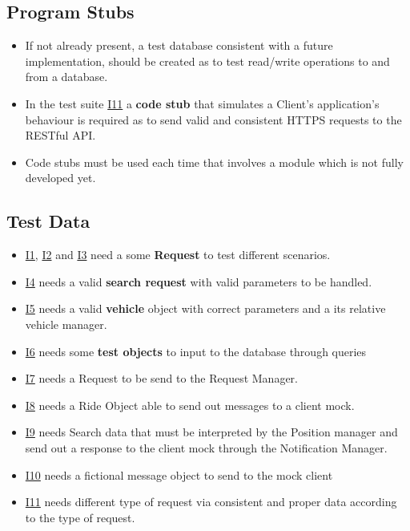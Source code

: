 \subsection{Program Stubs}
\begin{itemize}
\item If not already present, a test database consistent with a future implementation, should be created as to test read/write operations to and from a database.
\item In the test suite \hyperref[sub:IT11]{I11} a \textbf{code stub} that simulates a Client's application's behaviour is required as to send valid and consistent HTTPS requests to the RESTful API. 
\item Code stubs must be used each time that involves a module which is not fully developed yet.
\end{itemize}

\subsection{Test Data}
\begin{itemize}
\item \hyperref[sub:IT1]{I1}, \hyperref[sub:IT2]{I2} and \hyperref[sub:IT3]{I3}  need a some \textbf{Request} to test different scenarios.
\item \hyperref[sub:IT4]{I4} needs a valid \textbf{search request} with valid parameters to be handled.
\item \hyperref[sub:IT5]{I5} needs a valid \textbf{vehicle} object with correct parameters and a its relative vehicle manager.
\item \hyperref[sub:IT6]{I6} needs some \textbf{test objects} to input to the database through queries
\item \hyperref[sub:IT7]{I7} needs a Request to be send to the Request Manager.
\item \hyperref[sub:IT8]{I8} needs a Ride Object able to send out messages to a client mock.
\item \hyperref[sub:IT9]{I9} needs Search data that must be interpreted by the Position manager and send out a response to the client mock through the Notification Manager.
\item \hyperref[sub:IT10]{I10} needs a fictional message object to send to the mock client
\item \hyperref[sub:IT11]{I11} needs different type of request via consistent and proper data according to the type of request.
\end{itemize}